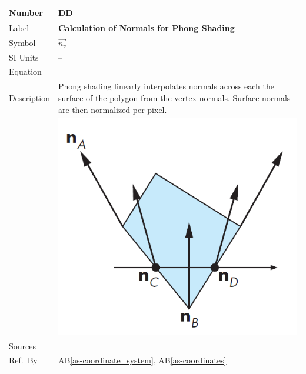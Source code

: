 \documentclass[12pt]{article}
\newcommand{\colAwidth}{0.13\textwidth}
\newcommand{\colBwidth}{0.82\textwidth}
\newcounter{defnum} %
\newcounter{datadefnum} %
\newcommand{\aBref}[1]{AB\ref{#1}}
\begin{document}
~\newline


\noindent
\begin{minipage}{\textwidth}
	\renewcommand*{\arraystretch}{1.5}
	\begin{tabular}{| p{\colAwidth} | p{\colBwidth}|}
		\hline
		\rowcolor[gray]{0.9}
		Number& DD{datadefnum}\thedatadefnum 
		\label{DD_Phong_Shading}\\
		\hline
		Label& \bf Calculation of Normals for Phong Shading\\
		\hline
		Symbol &$\vec{n_{v}}$\\
		\hline
		SI Units & --\\
		\hline
		Equation& \\
		\hline
		Description & Phong shading linearly interpolates normals across each 
		the surface of the polygon from the vertex normals. Surface normals are 
		then normalized per pixel.\\
		& \includegraphics[]{./images/phong-shading-interpolation} \\
		\hline
		Sources& \cite{shreiner2012}\\
		\hline
		Ref.\ By & \aBref{as-coordinate_system}, \aBref{as-coordinates} \\
		\hline
	\end{tabular}
\end{minipage}\\
\end{document}

